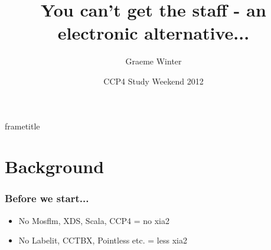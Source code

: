 \documentclass[slides,compress]{beamer}
\title{{\large You can't get the staff - an electronic alternative...}}
\author{Graeme Winter}
\institute{Diamond Light Source}
\date{CCP4 Study Weekend 2012}
\begin{document}

 {
  \vskip 0.4cm
  \begin{beamercolorbox}[sep=5pt,center,\insertframetitle]{frametitle}
    \insertframetitle\par%
  \end{beamercolorbox}
}

\frame{\maketitle}


\section{Background}

\begin{frame}
\frametitle{Before we start...}
\begin{itemize}
\item{No Mosflm, XDS, Scala, CCP4 = no xia2}
\item{No Labelit, CCTBX, Pointless etc. = less xia2}
\end{itemize}
\end{frame}
\end{document}
